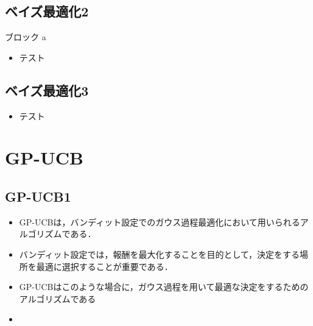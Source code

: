 \documentclass[dvipdfmx, 10.5pt]{beamer}
\begin{document}

\subsection{ベイズ最適化2}
\begin{frame}{\insertsubsection}
	\begin{block}{ブロック}
		a
	\end{block}
	\begin{itemize}
		\item テスト
	\end{itemize}
\end{frame}

\subsection{ベイズ最適化3}
\begin{frame}{\insertsubsection}
	\begin{itemize}
		\item テスト
	\end{itemize}

\end{frame}


\section{GP-UCB}

\subsection{GP-UCB1}

\begin{frame}{\insertsubsection}
	\begin{itemize}
		\item GP-UCBは，バンディット設定でのガウス過程最適化において用いられるアルゴリズムである．
		\item バンディット設定では，報酬を最大化することを目的として，決定をする場所を最適に選択することが重要である．
		\item GP-UCBはこのような場合に，ガウス過程を用いて最適な決定をするためのアルゴリズムである
		\item 
	\end{itemize}

\end{frame}
\end{document}
